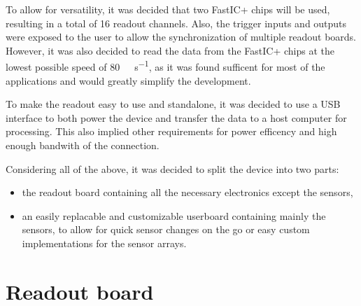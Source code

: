\documentclass{cernatsnote}
\begin{document}
To allow for versatility, it was decided that two FastIC+ chips will be used, resulting in a total of 16 readout channels. Also, the trigger inputs and outputs were exposed to the user to allow the synchronization of multiple readout boards. However, it was also decided to read the data from the FastIC+ chips at the lowest possible speed of \SI{80}{\mega\bit\per\second}, as it was found sufficent for most of the applications and would greatly simplify the development.

To make the readout easy to use and standalone, it was decided to use a USB interface to both power the device and transfer the data to a host computer for processing. This also implied other requirements for power efficency and high enough bandwith of the connection. 

Considering all of the above, it was decided to split the device into two parts: 
\begin{itemize}
    \item the readout board containing all the necessary electronics except the sensors,
    \item an easily replacable and customizable userboard containing mainly the sensors, to allow for quick sensor changes on the go or easy custom implementations for the sensor arrays. 
\end{itemize}


\section{Readout board}
\end{document}

